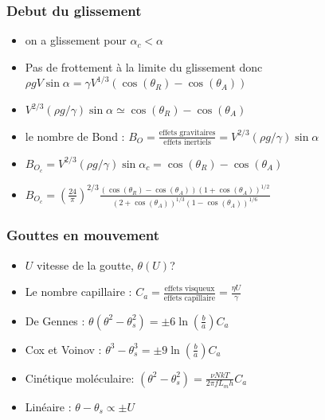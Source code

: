 \documentclass{beamer}
\begin{document}
\begin{frame}
\frametitle{Debut du glissement}
\begin{itemize}
\item on a glissement pour $\alpha_{c} < \alpha$
\item Pas de frottement à la limite du glissement donc $\rho g V \sin \alpha = \gamma V^{1/3} \left( \cos (\theta_{R}) - \cos (\theta_{A} ) \right)$
\item $V^{2/3}(\rho g / \gamma) \sin \alpha \simeq  \cos (\theta_{R}) - \cos (\theta_{A} ) $
\item le nombre de Bond : $B_{O} = \frac{\text{effets gravitaires}}{\text{effets inertiels}} = V^{2/3} (\rho g / \gamma)\sin \alpha$
\item $B_{O_{c}} = V^{2/3}(\rho g / \gamma)\sin \alpha_{c} = \cos (\theta_{R}) - \cos (\theta_{A} )$
\item $B_{O_{c}} = \left(\frac{24}{\pi}\right) ^{2/3} 
	\frac{\left(\cos (\theta_{R}) - \cos (\theta_{A})\right) \left(1 + \cos (\theta_{A})\right) ^{1/2}}
		{\left(2 + \cos (\theta_{A})\right) ^{1/3}\left(1 - \cos (\theta_{A})\right) ^{1/6}}$
\end{itemize}
\end{frame}


\begin{frame}
\frametitle{Gouttes en mouvement}
\begin{itemize}
\item $U$ vitesse de la goutte, $\theta(U)$?
\item Le nombre capillaire : $C_{a} = \frac{\text{effets visqueux}}{\text{effets capillaire}} = \frac{\eta U}{\gamma}$
\item De Gennes : $ \theta \left(\theta^{2} - \theta_{s}^{2}\right) = \pm 6\ln\left(\frac{b}{a}\right)C_{a}$
\item Cox et Voinov : $\theta^{3} - \theta_{s}^{3} = \pm 9\ln\left(\frac{b}{a}\right) C_{a}$
\item Cinétique moléculaire: $\left(\theta^{2} - \theta_{s}^{2}\right) = \frac{\nu NkT}{2\pi fL_{m}h}C_{a}$
\item Linéaire : $\theta - \theta_{s} \propto \pm U$
\end{itemize}
\end{frame}
\end{document}
